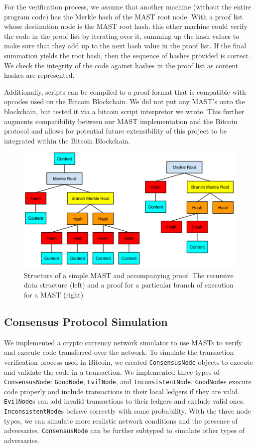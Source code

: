 \documentclass{vldb}
\begin{document}
For the verification process, we assume that another machine (without the
entire program code) has the Merkle hash of the MAST root node. With a proof
list whose destination node is the MAST root hash, this other machine could
verify the code in the proof list by iterating over it, summing up the hash
values to make sure that they add up to the next hash value in the proof list.
If the final summation yields the root hash, then the sequence of hashes
provided is correct. We check the integrity of the code against hashes in the
proof list as content hashes are represented.

Additionally, scripts can be compiled to a proof format that is compatible with
opcodes used on the Bitcoin Blockchain. We did not put any MAST's onto the blockchain, but tested it
via a bitcoin script interpretor we wrote. This further augments compatibility between our
MAST implementation and the Bitcoin protocol and allows for potential future
extensibility of this project to be integrated within the Bitcoin Blockchain.

\begin{figure}[h]
	\includegraphics[scale=.35]{mast}
	\caption{Structure of a simple MAST and accompanying proof. The recursive data structure (left) and a proof for a particular branch of execution for a MAST (right)}
	\label{system}
\end{figure}

\subsection{Consensus Protocol Simulation}

We implemented a crypto currency network simulator to use MASTs to verify and
execute code transferred over the network. To simulate the transaction
verification process used in Bitcoin, we created \texttt{ConsensusNode} objects to
execute and validate the code in a transaction. We implemented three types
of \texttt{ConsensusNode}: \texttt{GoodNode}, \texttt{EvilNode}, and
\texttt{InconsistentNode}. \texttt{GoodNode}s execute code properly and
include transactions in their local ledgers if they are valid.
\texttt{EvilNode}s can add invalid transactions to their
ledgers and exclude valid ones. \texttt{InconsistentNode}s behave correctly with some
probability. With the three node types, we can simulate more realistic network
conditions and the presence of adversaries. \texttt{ConsensusNode} can be further
subtyped to simulate other types of adversaries.
\end{document}
